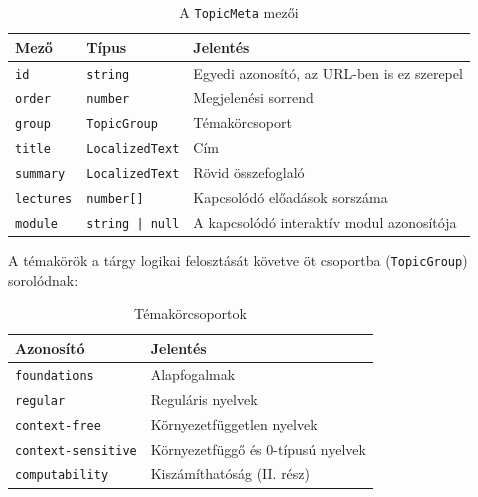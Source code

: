 \begin{table}[H]
    \centering
    \begin{tabularx}{\textwidth}{|l|l|X|}
        \hline
        \textbf{Mező} & \textbf{Típus} & \textbf{Jelentés} \\
        \hline
        \texttt{id}       & \texttt{string}        & Egyedi azonosító, az URL-ben is ez szerepel \\ \hline
        \texttt{order}    & \texttt{number}        & Megjelenési sorrend \\ \hline
        \texttt{group}    & \texttt{TopicGroup}    & Témakörcsoport \\ \hline
        \texttt{title}    & \texttt{LocalizedText} & Cím \\ \hline
        \texttt{summary}  & \texttt{LocalizedText} & Rövid összefoglaló \\ \hline
        \texttt{lectures} & \texttt{number[]}      & Kapcsolódó előadások sorszáma \\ \hline
        \texttt{module}   & \texttt{string | null} & A kapcsolódó interaktív modul azonosítója \\
        \hline
    \end{tabularx}
    \caption{A \texttt{TopicMeta} mezői}
    \label{tab:topicmeta}
\end{table}

A témakörök a tárgy logikai felosztását követve öt csoportba
(\texttt{TopicGroup}) sorolódnak:

\begin{table}[H]
    \centering
    \begin{tabular}{|l|l|}
        \hline
        \textbf{Azonosító} & \textbf{Jelentés} \\
        \hline
        \texttt{foundations}       & Alapfogalmak \\ \hline
        \texttt{regular}           & Reguláris nyelvek \\ \hline
        \texttt{context-free}      & Környezetfüggetlen nyelvek \\ \hline
        \texttt{context-sensitive} & Környezetfüggő és 0-típusú nyelvek \\ \hline
        \texttt{computability}     & Kiszámíthatóság (II. rész) \\
        \hline
    \end{tabular}
    \caption{Témakörcsoportok}
    \label{tab:groups}
\end{table}

\fi
